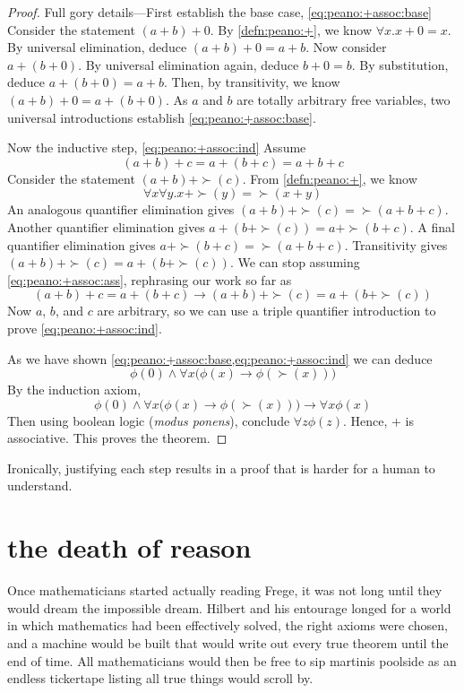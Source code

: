 \documentclass{scrbook}
\renewcommand{\implies}{\to}
\begin{document}
\begin{proof}
  Full gory details---First establish the base case, \cref{eq:peano:+assoc:base}
  Consider the statement $(a+b)+0$. By \cref{defn:peano:+}, we know $\forall x . x+0=x$. By universal elimination, deduce $(a+b)+0=a+b$. Now consider
  $a+(b+0)$. By universal elimination again, deduce $b+0=b$. By substitution, deduce $a+(b+0)=a+b$. Then, by transitivity, we know $(a+b)+0=a+(b+0)$. As $a$ and $b$ are totally arbitrary free variables, two universal introductions establish \cref{eq:peano:+assoc:base}.

  Now the inductive step, \cref{eq:peano:+assoc:ind}
  Assume \begin{equation}(a+b)+c=a+(b+c)=a+b+c\label{eq:peano:+assoc:ass}\end{equation}
  Consider the statement $(a+b)+\succ (c)$. From \cref{defn:peano:+}, we know
  \[\forall x \forall y . x+\succ(y)=\succ(x+y)\]
  An analogous quantifier elimination gives $(a+b)+\succ (c) = \succ(a+b+c)$. 
  Another quantifier elimination gives $a+(b+\succ(c))= a+\succ(b+c)$. A final quantifier elimination gives $a+\succ(b+c)=\succ(a+b+c)$. Transitivity gives $(a+b)+\succ(c)=a+(b+\succ(c))$. We can stop assuming \cref{eq:peano:+assoc:ass}, rephrasing our work so far as
  \[
  (a+b)+c=a+(b+c)\implies (a+b)+\succ(c) = a+(b+\succ (c))
  \]
  Now $a$, $b$, and $c$ are arbitrary, so we can use a triple quantifier introduction to prove \cref{eq:peano:+assoc:ind}. 

  As we have shown \cref{eq:peano:+assoc:base,eq:peano:+assoc:ind} we can deduce 
  \begin{equation}
    \label{eq:peano:+assoc:both}
    \phi(0)\wedge \forall x \bigl(\phi(x)\implies \phi(\succ(x))\bigr)
  \end{equation}
  By the induction axiom, 
  \[
  \phi(0)\wedge \forall x \bigl(\phi(x)\implies \phi(\succ(x))\bigr) \implies \forall x \phi(x)
  \]
  Then using boolean logic (\emph{modus ponens}), conclude $\forall z \phi(z)$. Hence, $+$ is associative. This proves the theorem. 
\end{proof}

Ironically, justifying each step results in a proof that is harder for a human to understand. 
\chapter[The Death of Reason]{the death of reason}
Once mathematicians started actually reading Frege, it was not long until they would dream the impossible dream. Hilbert and his entourage longed for a world in which mathematics had been effectively solved, the right axioms were chosen, and a machine would be built that would write out every true theorem until the end of time. All mathematicians would then be free to sip martinis poolside as an endless tickertape listing all true things would scroll by. \cite{wiki:hilbert-prog}
\end{document}
